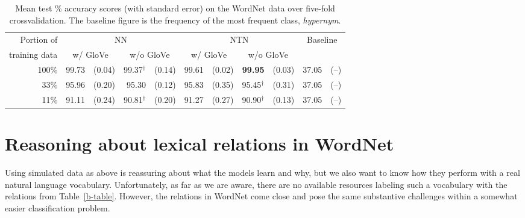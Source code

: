 \documentclass[letterpaper]{article}
\def\ii#1{\textit{#1}}
\begin{document}
\newcommand{\nodagger}{\phantom{$^\dagger$}}

\begin{table*}
\centering%
{
  \setlength{\tabcolsep}{15pt}
  \renewcommand{\arraystretch}{1.1}
  \begin{tabular}{r r@{ }r r@{ }r r@{ }r r@{ }r r@{ }r} 
    \toprule
     Portion of & \multicolumn{4}{c}{NN} & \multicolumn{4}{c}{NTN} & \multicolumn{2}{c}{Baseline}\\
     training data  & \multicolumn{2}{c}{w/ GloVe} & \multicolumn{2}{c}{w/o GloVe} & \multicolumn{2}{c}{w/ GloVe} & \multicolumn{2}{c}{w/o GloVe} \\
    \midrule
     100\%   & 99.73 &(0.04) & 99.37$^\dagger$ &(0.14)    & 99.61 &(0.02) & \textbf{99.95}\nodagger &(0.03) & 37.05 &(--)\\
     33\%    & 95.96 &(0.20) & 95.30\nodagger &(0.12)                & 95.83 &(0.35)          & 95.45$^\dagger$ &(0.31) & 37.05 &(--)\\
     11\%    & 91.11 &(0.24) & 90.81$^\dagger$ &(0.20)    & 91.27 &(0.27)          & 90.90$^\dagger$ &(0.13) & 37.05 &(--)\\
    \bottomrule
  \end{tabular}}
 \caption{Mean test \% accuracy scores (with standard error) on the WordNet data over five-fold crossvalidation. The baseline figure is the frequency of the most frequent class, \ii{hypernym}.\label{wn-table}} 
\end{table*}

\section{Reasoning about lexical relations in WordNet}\label{sec:wordnet}

Using simulated data as above is reassuring about what the models
learn and why, but we also want to know how they perform with a real
natural language vocabulary. Unfortunately, as far as we are aware,
there are no available resources labeling such a vocabulary with the
relations from Table~\ref{b-table}. However, the relations in WordNet
\cite{fellbaum2010wordnet,WordNet95} come close and pose the same substantive
challenges within a somewhat easier classification problem.

\end{document}
